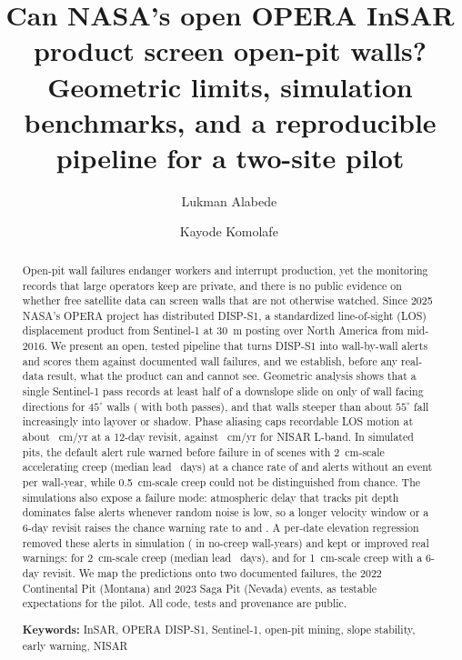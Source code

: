 \documentclass[aps,prd,twocolumn,superscriptaddress,nofootinbib,floatfix,preprintnumbers,10pt]{revtex4-2}
\begin{document}


\title{Can NASA's open OPERA InSAR product screen open-pit walls?\\ Geometric limits, simulation benchmarks, and a reproducible pipeline for a two-site pilot}

\author{Lukman Alabede\,}
\author{Kayode Komolafe\,}

\begin{abstract}
Open-pit wall failures endanger workers and interrupt production, yet the monitoring records that large operators keep are private, and there is no public evidence on whether free satellite data can screen walls that are not otherwise watched. Since 2025 NASA's OPERA project has distributed DISP-S1, a standardized line-of-sight (LOS) displacement product from Sentinel-1 at 30~m posting over North America from mid-2016. We present an open, tested pipeline that turns DISP-S1 into wall-by-wall alerts and scores them against documented wall failures, and we establish, before any real-data result, what the product can and cannot see. Geometric analysis shows that a single Sentinel-1 pass records at least half of a downslope slide on only \GeoSensSingleFortyFive{} of wall facing directions for $45^\circ$ walls (\GeoSensEitherFortyFive{} with both passes), and that walls steeper than about $55^\circ$ fall increasingly into layover or shadow. Phase aliasing caps recordable LOS motion at about \AliasTwelve{}~cm/yr at a 12-day revisit, against \AliasNisar{}~cm/yr for NISAR L-band. In \NReal{} simulated pits, the default alert rule warned before failure in \WTwoOneTwenty{} of scenes with 2~cm-scale accelerating creep (median lead \LTwoOneTwenty{}~days) at a chance rate of \Chance{} and \FA{} alerts without an event per wall-year, while 0.5~cm-scale creep could not be distinguished from chance. The simulations also expose a failure mode: atmospheric delay that tracks pit depth dominates false alerts whenever random noise is low, so a longer velocity window or a 6-day revisit raises the chance warning rate to \ChanceWinOneTwoZero{} and \ChanceSix{}. A per-date elevation regression removed these alerts in simulation (\NullUnmatchedCor{} in \NullWallYearsCor{} no-creep wall-years) and kept or improved real warnings: \WTwoOneTwentyCor{} for 2~cm-scale creep (median lead \LTwoOneTwentyCor{}~days), and \WSixCor{} for 1~cm-scale creep with a 6-day revisit. We map the predictions onto two documented failures, the 2022 Continental Pit (Montana) and 2023 Saga Pit (Nevada) events, as testable expectations for the pilot. All code, tests and provenance are public.
\smallskip

\noindent\textbf{Keywords:} InSAR, OPERA DISP-S1, Sentinel-1, open-pit mining, slope stability, early warning, NISAR
\end{abstract}
\end{document}
